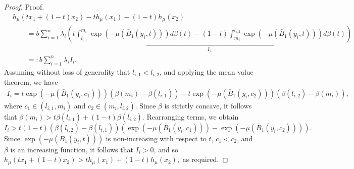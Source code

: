 \documentclass[stsy,sglanonrev]{informs4}
\newcommand{\death}{{\beta}}
\begin{document}
\begin{proof}{Proof.}
\begin{align*}
    &h_{\mu}(t x_1 + (1 - t) x_2) - t h_{\mu}(x_1) - (1 - t) h_{\mu}(x_2) \\
    &\qquad = b\sum_{i=1}^{n} \lambda_i \underbrace{\left( t\int_{l_{i,1}}^{m_i} \exp(-\mu(\bar{B}_1(y_i,t))) d\death(t)  - (1 - t) \int_{m_i}^{l_{i,2}} \exp(-\mu(\bar{B}_1(y_i,t))) d\death(t) \right)}_{I_i} \\ & \qquad=: b\sum_{i=1}^{n} \lambda_i I_i.
\end{align*}
Assuming without loss of generality that \( l_{i,1} < l_{i,2} \), and applying the mean value theorem, we have
\begin{align*}
    I_i = t \exp(-\mu(\bar{B}_1(y_i, c_1))) (\death(m_i) - \death(l_{i,1})) - t \exp(-\mu(\bar{B}_1(y_i, c_2))) (\death(l_{i,2}) - \death(m_i)),
\end{align*}
where \( c_1 \in (l_{i,1}, m_i) \) and \( c_2 \in (m_i, l_{i,2}) \). Since \( \death \) is strictly concave, it follows that $\death(m_i) > t \death(l_{i,1}) + (1 - t) \death(l_{i,2})$. Rearranging terms, we obtain
\[
I_i > t(1 - t)(\death(l_{i,2}) - \death(l_{i,1})) \left( \exp(-\mu(\bar{B}_1(y_i, c_1))) - \exp(-\mu(\bar{B}_1(y_i, c_2))) \right).
\]
Since \( \exp(-\mu(\bar{B}_1(y_i,t))) \) is non-increasing with respect to \( t \), \( c_1 < c_2 \), and \( \death \) is an increasing function, it follows that \( I_i > 0 \), and so 
$h_{\mu}(t x_1 + (1 - t) x_2) > t h_{\mu}(x_1) + (1 - t) h_{\mu}(x_2),$
as required. \hfill \Halmos
\end{proof}
\end{document}
